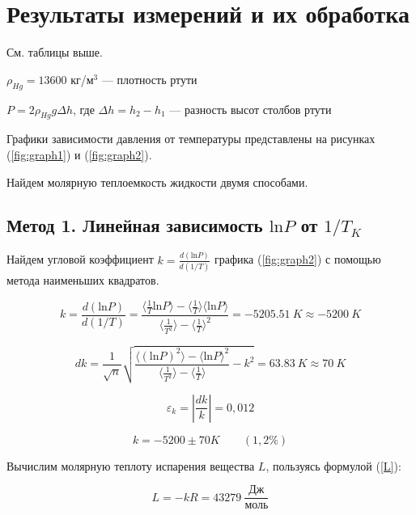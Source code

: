 \documentclass[a4paper,12pt]{article} %
\begin{document}
\section{Результаты измерений и их обработка}

См. таблицы выше.

\medskip

$\rho_{Hg} = 13600$ кг/м$^3$ — плотность ртути

$P = 2\rho_{Hg} g\Delta h$, где $\Delta h = h_2 - h_1$ — разность высот столбов ртути

\medskip

Графики зависимости давления от температуры представлены на рисунках (\ref{fig:graph1}) и (\ref{fig:graph2}).

Найдем молярную теплоемкость жидкости двумя способами.

\subsection*{Метод 1. Линейная зависимость $\mbox{ln}P$ от $1/T_K$}

Найдем угловой коэффициент $k = \frac{d(\mbox{ln}P)}{d(1/T)}$ графика (\ref{fig:graph2}) с помощью метода наименьших квадратов.

\begin{equation}
  \label{k}
  k = \frac{d(\mbox{ln}P)}{d(1/T)} = \frac{\langle \frac{1}{T} \mbox{ln}P \rangle - \langle \frac{1}{T} \rangle \langle \mbox{ln}P \rangle}{\langle \frac{1}{T^2} \rangle - \langle \frac{1}{T} \rangle ^2} = - 5205.51\ K \approx - 5200\ K
\end{equation}

\begin{equation}
  \label{dk}
  dk = \frac{1}{\sqrt{n}} \sqrt{\frac{\langle (\mbox{ln}P)^2 \rangle - \langle \mbox{ln}P \rangle ^2}{\langle \frac{1}{T^2} \rangle - \langle \frac{1}{T} \rangle} - k^2} = 63.83\ K \approx 70\ K
\end{equation}

\begin{equation}
  \label{ek}
  \varepsilon_k = |\frac{dk}{k}| = 0,012
\end{equation}

\begin{equation}
  k = - 5200 \pm 70 K \qquad (1,2\%) 
\end{equation}

Вычислим молярную теплоту испарения вещества $L$, пользуясь формулой (\ref{L}):

\begin{equation}
  L = -kR = 43 279\ \frac{\mbox{Дж}}{\mbox{моль}}
\end{equation}
\end{document}
